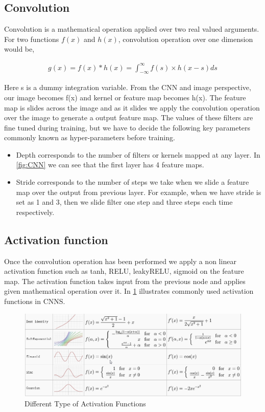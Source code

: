 \subsection{Convolution}

Convolution is a mathematical operation applied over two real valued arguments. For two functions $f(x)$ and $h(x)$, convolution operation over one dimension would be,

 \begin{equation}\label{eq:convolution-1d}
        \begin{aligned}
            g(x)=f(x) \ast h(x) = \int_{-\infty }^{\infty} f(s) \times h(x-s) ds
        \end{aligned}
\end{equation}

Here s is a dummy integration variable. 
From the CNN and image perspective, our image becomes f(x) and kernel or feature map becomes h(x). The feature map is slides across the image and as it slides we apply the convolution operation over the image to generate a output feature map. The values of these filters are fine tuned during training, but we have to decide the following key parameters commonly known as hyper-parameters before training.
\begin{itemize}
    \item  Depth corresponds to the number of filters or kernels mapped at any layer. In \cref{fig:CNN} we can see that the first layer has 4 feature maps.
    \item Stride corresponds to the number of steps we take when we slide a feature map over the output from previous layer. For example, when we have stride is set as 1 and 3, then we slide filter one step and three steps each time respectively.
\end{itemize}

\subsection{ Activation function}
Once the convolution operation has been performed we apply a non linear activation function such as tanh, RELU, leakyRELU, sigmoid on the feature map. The activation function takes input from the previous node and applies given mathematical operation over it. In \cref{fig:activation} illustrates commonly used activation functions in CNNS.

\begin{figure}[H]
  \centering
    \includegraphics[scale=.3, angle=0]{Files/activation-functions.png}
    \caption[Different Type of Activation Functions]{Different Type of Activation Functions \cite{activation}}
    \label{fig:activation}
\end{figure}

